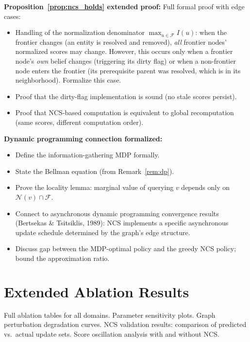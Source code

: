 \documentclass[11pt,a4paper]{article}
\newcommand{\placeholder}[1]{%
  \begin{tcolorbox}[colback=yellow!10,colframe=orange!60!black,
    fonttitle=\bfseries,title=Placeholder]
    #1
  \end{tcolorbox}%
}
\begin{document}
\placeholder{%
  \textbf{Proposition~\ref{prop:ncs_holds} extended proof:}
  Full formal proof with edge cases:
  \begin{itemize}[noitemsep]
    \item Handling of the normalization denominator
          $\max_{u \in \mathcal{F}} I(u)$: when the frontier changes
          (an entity is resolved and removed), \emph{all} frontier nodes'
          normalized scores may change. However, this occurs only when a
          frontier node's \emph{own} belief changes (triggering its dirty
          flag) or when a non-frontier node enters the frontier (its
          prerequisite parent was resolved, which is in its neighborhood).
          Formalize this case.
    \item Proof that the dirty-flag implementation is sound (no stale
          scores persist).
    \item Proof that NCS-based computation is equivalent to global
          recomputation (same scores, different computation order).
  \end{itemize}

  \textbf{Dynamic programming connection formalized:}
  \begin{itemize}[noitemsep]
    \item Define the information-gathering MDP formally.
    \item State the Bellman equation (from Remark~\ref{rem:dp}).
    \item Prove the locality lemma: marginal value of querying $v$
          depends only on $\mathcal{N}(v) \cap \mathcal{F}$.
    \item Connect to asynchronous dynamic programming convergence
          results (Bertsekas \& Tsitsiklis, 1989): NCS implements
          a specific asynchronous update schedule determined by the
          graph's edge structure.
    \item Discuss gap between the MDP-optimal policy and the greedy
          NCS policy; bound the approximation ratio.
  \end{itemize}
}

\section{Extended Ablation Results}
\label{app:ablation}

\placeholder{%
  Full ablation tables for all domains.
  Parameter sensitivity plots.
  Graph perturbation degradation curves.
  NCS validation results: comparison of predicted vs.\ actual update sets.
  Score oscillation analysis with and without NCS.
}
\end{document}
